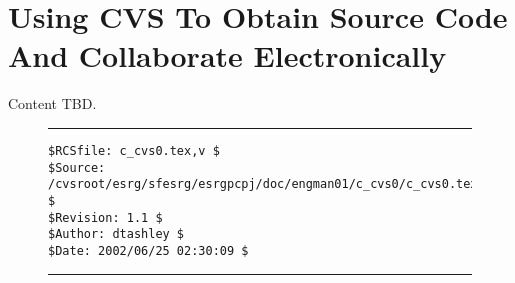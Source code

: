 %
\chapter{Using CVS To Obtain Source Code And Collaborate Electronically}
\label{ccvs0}

Content TBD.


\noindent\begin{figure}[!b]
\noindent\rule[-0.25in]{\textwidth}{1pt}
\begin{tiny}
\begin{verbatim}
$RCSfile: c_cvs0.tex,v $
$Source: /cvsroot/esrg/sfesrg/esrgpcpj/doc/engman01/c_cvs0/c_cvs0.tex,v $
$Revision: 1.1 $
$Author: dtashley $
$Date: 2002/06/25 02:30:09 $
\end{verbatim}
\end{tiny}
\noindent\rule[0.25in]{\textwidth}{1pt}
\end{figure}
%
